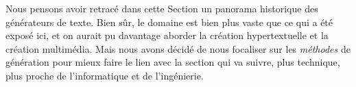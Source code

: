 \documentclass{article}
\newenvironment{citationbox}
{\begin{center}
		\begin{minipage}{.8\textwidth}
		}
		{
		\end{minipage}	
\end{center}
}
\begin{document}
				
				Nous pensons avoir retracé dans cette Section un panorama historique des générateurs de texte. Bien sûr, le domaine est bien plus vaste que ce qui a été exposé ici, et on aurait pu davantage aborder la création hypertextuelle et la création multimédia. Mais nous avons décidé de nous focaliser sur les \textit{méthodes} de génération pour mieux faire le lien avec la section qui va suivre, plus technique, plus proche de l'informatique et de l'ingénierie.
				
				
				
				
				
				
				
				
				
				
				
				
			
				
				

				
				
	

		\newpage
\end{document}
